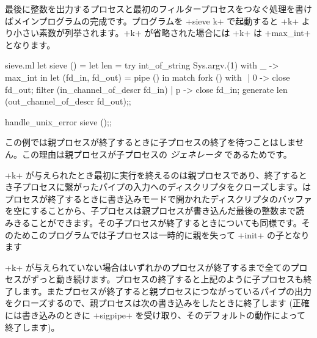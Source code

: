 最後に整数を出力するプロセスと最初のフィルタープロセスをつなぐ処理を書けばメインプログラムの完成です。プログラムを \ml+sieve k+ で起動すると \ml+k+ より小さい素数が列挙されます。\ml+k+ が省略された場合には \ml+k+ は \ml+max_int+ となります。
%
\begin{listingcodefile}[style=numbers]{sieve.ml}
let sieve () =
  let len = try int_of_string Sys.argv.(1) with _ -> max_int in
  let (fd_in, fd_out) = pipe () in
  match fork () with $\label{prog:sievefork}$
  | 0 ->
      close fd_out;
      filter (in_channel_of_descr fd_in)
  | p ->
      close fd_in;
      generate len (out_channel_of_descr fd_out);; $\label{prog:gen}$

handle_unix_error sieve ();;
\end{listingcodefile}
%

この例では親プロセスが終了するときに子プロセスの終了を待つことはしません。この理由は親プロセスが子プロセスの \emph{ジェネレータ} であるためです。

\ml+k+ が与えられたとき最初に実行を終えるのは親プロセスであり、終了するとき子プロセスに繋がったパイプの入力へのディスクリプタをクローズします。\ocaml はプロセスが終了するときに書き込みモードで開かれたディスクリプタのバッファを空にすることから、子プロセスは親プロセスが書き込んだ最後の整数まで読みきることができます。その子プロセスが終了するときについても同様です。そのためこのプログラムでは子プロセスは一時的に親を失って \ml+init+ の子となります

\ml+k+ が与えられていない場合はいずれかのプロセスが終了するまで全てのプロセスがずっと動き続けます。プロセスの終了すると上記のように子プロセスも終了します。またプロセスが終了すると親プロセスにつながっているパイプの出力をクローズするので、親プロセスは次の書き込みをしたときに終了します (正確には書き込みのときに \ml+sigpipe+ を受け取り、そのデフォルトの動作によって終了します)。


